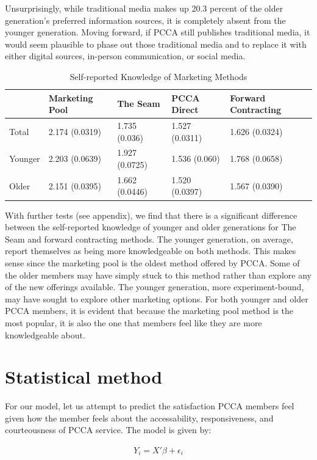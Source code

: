 \documentclass[a4paper]{article}
\begin{document}
Unsurprisingly, while traditional media makes up 20.3 percent of the older generation's preferred information sources, it is completely absent from the younger generation. Moving forward, if PCCA still publishes traditional media, it would seem plausible to phase out those traditional media and to replace it with either digital sources, in-person communication, or social media.

\begin{table}[H]
	\caption{Self-reported Knowledge of Marketing Methods}
	\centering\begin{tabular}{l|llll}
		& Marketing Pool & The Seam & PCCA Direct & Forward Contracting \\
		\hline \hline
	Total & 2.174 (0.0319) & 1.735 (0.036) & 1.527 (0.0311) & 1.626 (0.0324) \\
	Younger & 2.203 (0.0639) & 1.927 (0.0725) & 1.536 (0.060) & 1.768 (0.0658) \\
	Older & 2.151 (0.0395) & 1.662 (0.0446) & 1.520 (0.0397) & 1.567 (0.0390)
	\end{tabular}
\end{table}

With further tests (see appendix), we find that there is a significant difference between the self-reported knowledge of younger and older generations for The Seam and forward contracting methods. The younger generation, on average, report themselves as being more knowledgeable on both methods. This makes sense since the marketing pool is the oldest method offered by PCCA. Some of the older members may have simply stuck to this method rather than explore any of the new offerings available. The younger generation, more experiment-bound, may have sought to explore other marketing options. For both younger and older PCCA members, it is evident that because the marketing pool method is the most popular, it is also the one that members feel like they are more knowledgeable about. 

\section{Statistical method}

For our model, let us attempt to predict the satisfaction PCCA members feel given how the member feels about the accessability, responsiveness, and courteousness of PCCA service. The model is given by:

\begin{align}
	Y_{i}=X'\beta+\epsilon_{i}
\end{align}
\end{document}
